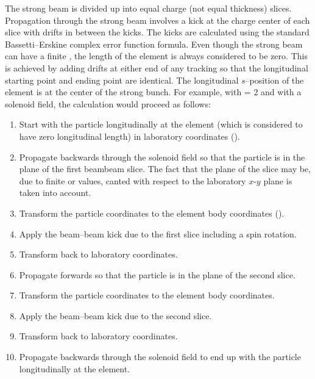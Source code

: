 The strong beam is divided up into  equal charge (not equal thickness) slices.
Propagation through the strong beam involves a kick at the charge center of each slice with drifts
in between the kicks. The kicks are calculated using the standard Bassetti--Erskine complex error
function formula\cite{b:talman}.  Even though the strong beam can have a finite , the
length of the element is always considered to be zero. This is achieved by adding drifts at either
end of any tracking so that the longitudinal starting point and ending point are identical. The
longitudinal $s$--position of the  element is at the center of the strong bunch. For
example, with  = 2 and with a solenoid field, the calculation would proceed as follows:
\begin{enumerate}[topsep=-0.2ex,itemsep=-0.0ex]
  \item 
Start with the particle longitudinally at the  element (which is considered to have
zero longitudinal length) in laboratory coordinates ().
  \item
Propagate backwards through the solenoid field so that the particle is in the plane of the first
beambeam slice. The fact that the plane of the slice may be, due to finite  or
 values, canted with respect to the laboratory $x$-$y$ plane is taken into account.
  \item
Transform the particle coordinates to the  element body coordinates
().
  \item
Apply the beam--beam kick due to the first slice including a spin rotation.
  \item
Transform back to laboratory coordinates.
  \item
Propagate forwards so that the particle is in the plane of the second slice.
  \item
Transform the particle coordinates to the  element body coordinates.
  \item 
Apply the beam--beam kick due to the second slice.
  \item 
Transform back to laboratory coordinates.
  \item 
Propagate backwards through the solenoid field to end up with the particle longitudinally at the
 element.
\end{enumerate}

